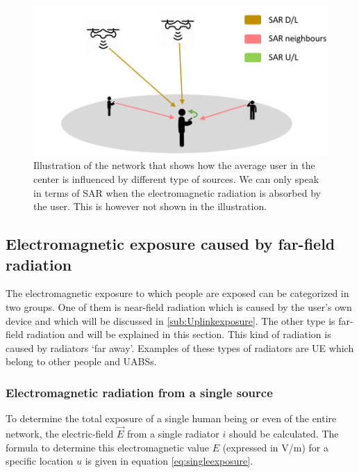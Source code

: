 \begin{figure}[h!]
\centering
  \includegraphics[width=\textwidth/3*2]{../images/networkExampleWith3Sources.png}
  \caption{Illustration of the network that shows how the average user in the center is influenced by different type of sources. We can only speak in terms of \gls{SAR}
  when the electromagnetic radiation is absorbed by the user. This is however not shown in the illustration.}
  \label{fig:networkIllustration}
\end{figure}

\subsection{Electromagnetic exposure caused by far-field radiation} %
\label{sub:Calculatingdownlinkexpsure}

The electromagnetic exposure to which people are exposed can be categorized in two groups. One of them is near-field radiation which is caused 
by the user's own device and which will be discussed in \ref{sub:Uplinkexposure}.
The other type is far-field radiation and will be explained in this section. This kind of radiation is caused by radiators `far away'.
Examples of these types of radiators are \gls{UE} which belong to other people and \gls{UABS}s. 

\subsubsection{Electromagnetic radiation from a single source}
\label{sec:calculatingexposure}

To determine the total exposure of a single human being or even of the entire network, the electric-field $\vec{E}$ from a single radiator $i$ should be calculated.
The formula to determine this electromagnetic value $E$ (expressed in V/m) for a specific location $u$ is given in equation \ref{eq:singleexposure}.

